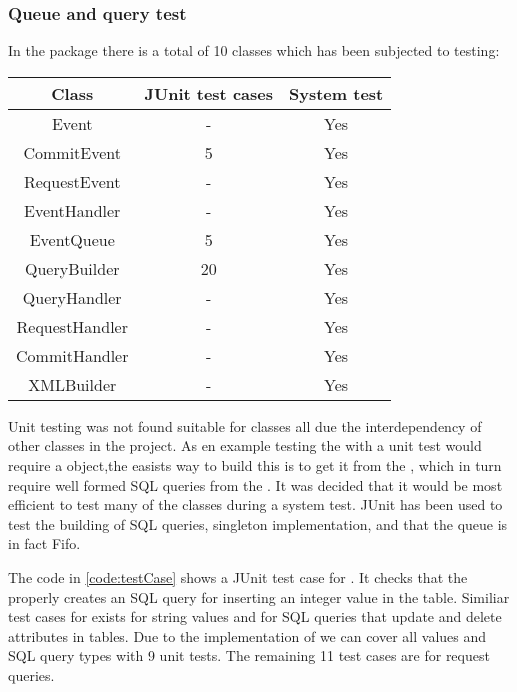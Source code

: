 \subsubsection{Queue and query test}
In the  package there is a total of 10 classes which has been subjected to testing: 

\begin{table}[H]
  \begin{center}
  \begin{tabular}{c|c|c}
    Class          & JUnit test cases & System test\\
\hline
    Event          & -                &Yes\\
    CommitEvent    & 5                &Yes\\
    RequestEvent   & -                &Yes\\
    EventHandler   & -                &Yes\\
    EventQueue     & 5                &Yes\\
    QueryBuilder   & 20               &Yes\\
    QueryHandler   & -                &Yes\\
    RequestHandler & -                &Yes\\
    CommitHandler  & -                &Yes\\
    XMLBuilder     & -                &Yes\\
  \end{tabular}
  \end{center}
\end{table}

Unit testing was not found suitable for classes all due the interdependency of other classes in the project. As en example testing the  with a unit test would require
a  object,the easists way to build this is to get it from the , which in turn require well formed SQL queries from the .
It was decided that it would be most efficient to test many of the classes during a system test. JUnit has been used to test the building of SQL queries, singleton implementation,
and that the queue is in fact Fifo. 

The code in \autoref{code:testCase} shows a JUnit test case for . It checks that the  properly creates an SQL query for inserting an integer value
in the  table. Similiar test cases for exists for string values and for SQL queries that update and delete attributes in tables.
Due to the implementation of  we can cover all values and SQL query types with 9 unit tests. The remaining 11 test cases are for request queries.

